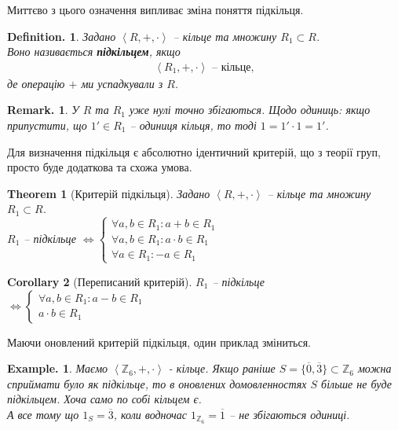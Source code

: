\documentclass[a4paper, 10pt]{article}
\theoremstyle{theoremdd}
\newtheorem{theorem}{Theorem}[subsection]
\theoremstyle{theoremdd}
\theoremstyle{theoremdd}
\newtheorem*{definition*}{Definition.}
\theoremstyle{theoremdd}
\theoremstyle{theoremdd}
\theoremstyle{theoremdd}
\newtheorem*{example*}{Example.}
\theoremstyle{theoremdd}
\theoremstyle{theoremdd}
\theoremstyle{theoremdd}
\theoremstyle{theoremdd}
\theoremstyle{theoremdd}
\theoremstyle{theoremdd}
\newtheorem*{remark*}{Remark.}
\theoremstyle{theoremdd}
\theoremstyle{theoremdd}
\newtheorem{corollary}[theorem]{Corollary}
\theoremstyle{theoremdd}
\begin{document}
Миттєво з цього означення випливає зміна поняття підкільця.
\begin{definition*}
Задано $\left<R,+, \cdot \right>$ -- кільце та множину $R_1 \subset R$.\\
Воно називається \textbf{підкільцем}, якщо 
\begin{align*}
\left<R_1,+,\cdot \right> \text{ -- кільце},
\end{align*}
де операцію $+$ ми успадкували з $R$. 
\end{definition*}

\begin{remark*}
У $R$ та $R_1$ уже нулі точно збігаються. Щодо одиниць: якщо припустити, що $1' \in R_1$ -- одиниця кільця, то тоді $1 = 1' \cdot 1 = 1'$.
\end{remark*}

Для визначення підкільця є абсолютно ідентичний критерій, що з теорії груп, просто буде додаткова та схожа умова.

\begin{theorem}[Критерій підкільця]
\label{subring_criterion_updated}
Задано $\left<R,+, \cdot \right>$ -- кільце та множину $R_1 \subset R$.\\
$R_1$ -- підкільце $\iff \begin{cases} \forall a,b \in R_1: a+b \in R_1 \\ \forall a,b \in R_1: a \cdot b \in R_1 \\ \forall a \in R_1: -a \in R_1 \end{cases}$ \color{red}{та $0_R,1_R \in R_1$.}\\
\end{theorem}

\begin{corollary}[Переписаний критерій]
$R_1$ -- підкільце $\iff \begin{cases} \forall a,b \in R_1: a-b \in R_1 \\ a \cdot b \in R_1 \end{cases}$ \color{red}{та $0_R,1_R \in R_1$.}\\
\end{corollary}

Маючи оновлений критерій підкільця, один приклад зміниться.

\begin{example*}
Маємо $\left< \mathbb{Z}_6, +, \cdot \right>$ - кільце. Якщо раніше $S = \{\overline{0}, \overline{3}\} \subset \mathbb{Z}_6$ можна сприймати було як підкільце, то в оновлених домовленностях $S$ більше не буде підкільцем. Хоча само по собі кільцем є.\\
А все тому що $1_S = \overline{3}$, коли водночас $1_{\mathbb{Z}_6} = \overline{1}$ -- не збігаються одиниці.
\end{example*}
\end{document}
